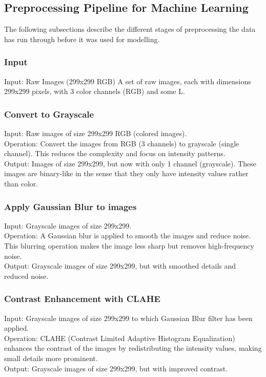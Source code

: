 \documentclass{article}
\begin{document}
\subsection{Preprocessing Pipeline for Machine Learning} \label{preprocessing_pipeline}
The following subsections describe the different stages of preprocessing the data has run through before it was used for modelling.
\subsubsection{Input}
Input: Raw Images (299x299 RGB)
A set of raw images, each with dimensions 299x299 pixels, with 3 color channels (RGB) and some L.

\subsubsection{Convert to Grayscale}
Input: Raw images of size 299x299 RGB (colored images).\\
Operation: Convert the images from RGB (3 channels) to grayscale (single channel). This reduces the complexity and focus on intensity patterns.\\
Output: Images of size 299x299, but now with only 1 channel (grayscale). These images are binary-like in the sense that they only have intensity values rather than color.

\subsubsection{Apply Gaussian Blur to images}
Input: Grayscale images of size 299x299.\\
Operation: A Gaussian blur is applied to smooth the images and reduce noise. This blurring operation makes the image less sharp but removes high-frequency noise.\\
Output: Grayscale images of size 299x299, but with smoothed details and reduced noise.\\

\subsubsection{Contrast Enhancement with CLAHE}
Input: Grayscale images of size 299x299 to which Gaussian Blur filter has been applied.\\
Operation: CLAHE (Contrast Limited Adaptive Histogram Equalization) enhances the contrast of the images by redistributing the intensity values, making small details more prominent.\\
Output: Grayscale images of size 299x299, but with improved contrast.\\
\end{document}
